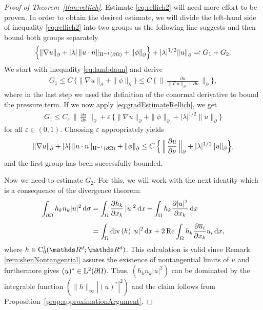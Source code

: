 \begin{proof}[Proof of Theorem~\ref{thm:rellich}]
  Estimate \eqref{eq:rellich2} will need more effort to be proven.
  In order to obtain the desired estimate, we will divide the left-hand side of inequality \eqref{eq:rellich2} into two groups as the following line suggests and then bound both groups separately
  \begin{align*}
      \Big\{ \|\nabla u\|^{}_\partial + |\lambda|\, \|u \cdot n\|_{\mathrm{H}^{-1}(\partial\Omega)} + \|\phi\|^{}_\partial \Big\} + |\lambda|^{1/2} \|u\|^{}_\partial \eqqcolon G_1 + G_2.
  \end{align*}
  We start with inequality \eqref{eq:lambdaun} and derive
  \begin{align*}
    G_1
    \leq C\, \Big\{ \|\nabla u\|^{}_\partial + \| \phi\|^{}_\partial \Big\}
    \leq C \, \Big\{\, \Big\|\,\frac{\partial u}{\|\nabla u\|^{}_\partial +\partial \nu}\, \Big\|^{}_\partial  \Big\},
  \end{align*}
  where in the last step we used the definition of the conormal derivative to bound the pressure term.
  If we now apply \eqref{eq:gradEstimateRellich}, we get
  \begin{align*}
    G_1
    \leq C_\varepsilon\, \Big\| \, \frac{\partial u}{\partial \nu} \, \Big\|^{}_\partial + \varepsilon \, \Big\{ \|\nabla u\|^{}_\partial + \|\phi\|^{}_\partial + |\lambda|^{1/2} \| u \|^{}_\partial \Big\}
  \end{align*}
  for all $\varepsilon \in (0,1)$.
  Choosing $\varepsilon$ appropriately yields
  \begin{align}
    \label{eq:partOfRellich2}
    \|\nabla u\|^{}_\partial + |\lambda| \, \|u \cdot n\|_{\mathrm{H}^{-1}(\partial\Omega)}+ \|\phi\|^{}_\partial 
    \leq C\, \Big\{ \, \Big\|\,\frac{\partial u}{\partial \nu} \, \Big\|^{}_\partial + |\lambda|^{1/2} \| u\|^{}_\partial \Big\},
  \end{align}
  and the first group has been successfully bounded.

  Now we need to estimate $G_2$.
  For this, we will work with the next identity which is a consequence of the divergence theorem:
  \begin{align}
    \int_{\partial\Omega} h_k n_k |u|^2 \, {\operatorname{d}\!{\sigma}}
    &= \int_{\Omega} \frac{\partial h_k}{\partial x_k}\, |u|^2 \, {\operatorname{d}\!{x}} + \int_{\Omega} h_k \frac{\partial |u|^2}{\partial x_k}  \, {\operatorname{d}\!{x}} \nonumber\\[0.5em]
    \label{eq:hknkgreen}
    &= \int_\Omega \mathrm{div\,} (h)\, |u|^2 \, {\operatorname{d}\!{x}} + 2 \operatorname{Re} \int_\Omega h_k \frac{\partial \overline u_i}{\partial x_k} u_i \, {\operatorname{d}\!{x}},
  \end{align}
  where $h \in \CC_0^1(\R^d; \R^d)$.
  This calculation is valid since Remark \ref{rem:shenNontangential} assures the existence of nontangential limits of $u$ and furthermore gives $(u)^* \in \mathrm{L}^2(\partial\Omega)$. Thus, $( h_k n_k |u|^2 )$ can be dominated by the integrable function $(\|h\|_\infty |(u)^*|^2)$ and the claim follows from Proposition~\ref{prop:approximationArgument}.


\end{proof}

